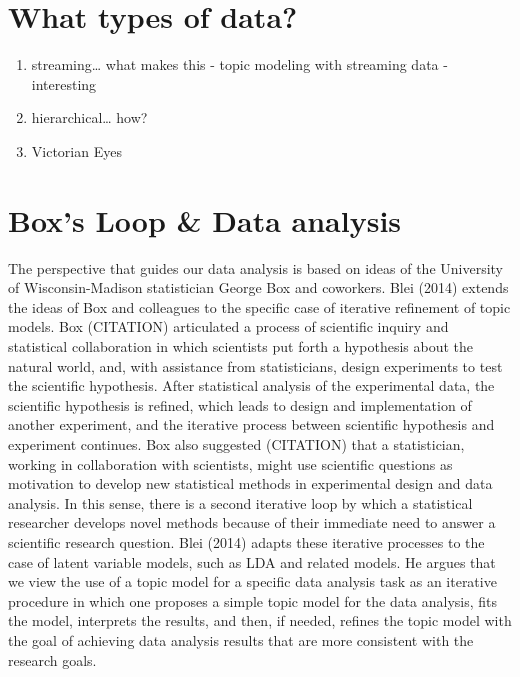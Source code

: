 \documentclass[12pt,]{article}
\providecommand{\tightlist}{%
  \setlength{\itemsep}{0pt}\setlength{\parskip}{0pt}}
\begin{document}
\section{What types of data?}\label{what-types-of-data}

\begin{enumerate}
\def\labelenumi{\arabic{enumi}.}
\tightlist
\item
  streaming\ldots{} what makes this - topic modeling with streaming data
  - interesting
\item
  hierarchical\ldots{} how?
\item
  Victorian Eyes
\end{enumerate}

\section{Box's Loop \& Data analysis}\label{boxs-loop-data-analysis}



The perspective that guides our data analysis is based on ideas of the
University of Wisconsin-Madison statistician George Box and coworkers.
Blei (2014) extends the ideas of Box and colleagues to the specific case
of iterative refinement of topic models. Box (CITATION) articulated a
process of scientific inquiry and statistical collaboration in which
scientists put forth a hypothesis about the natural world, and, with
assistance from statisticians, design experiments to test the scientific
hypothesis. After statistical analysis of the experimental data, the
scientific hypothesis is refined, which leads to design and
implementation of another experiment, and the iterative process between
scientific hypothesis and experiment continues. Box also suggested
(CITATION) that a statistician, working in collaboration with
scientists, might use scientific questions as motivation to develop new
statistical methods in experimental design and data analysis. In this
sense, there is a second iterative loop by which a statistical
researcher develops novel methods because of their immediate need to
answer a scientific research question. Blei (2014) adapts these
iterative processes to the case of latent variable models, such as LDA
and related models. He argues that we view the use of a topic model for
a specific data analysis task as an iterative procedure in which one
proposes a simple topic model for the data analysis, fits the model,
interprets the results, and then, if needed, refines the topic model
with the goal of achieving data analysis results that are more
consistent with the research goals.
\end{document}
